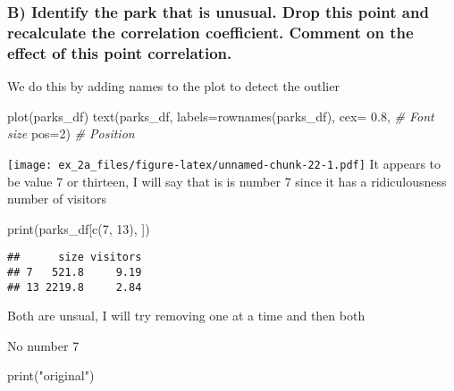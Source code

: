 \documentclass[
]{article}
\newenvironment{Shaded}{\begin{snugshade}}{\end{snugshade}}
\newcommand{\AttributeTok}[1]{\textcolor[rgb]{0.77,0.63,0.00}{#1}}
\newcommand{\CommentTok}[1]{\textcolor[rgb]{0.56,0.35,0.01}{\textit{#1}}}
\newcommand{\DecValTok}[1]{\textcolor[rgb]{0.00,0.00,0.81}{#1}}
\newcommand{\FloatTok}[1]{\textcolor[rgb]{0.00,0.00,0.81}{#1}}
\newcommand{\FunctionTok}[1]{\textcolor[rgb]{0.00,0.00,0.00}{#1}}
\newcommand{\NormalTok}[1]{#1}
\newcommand{\StringTok}[1]{\textcolor[rgb]{0.31,0.60,0.02}{#1}}
\begin{document}
\hypertarget{b-identify-the-park-that-is-unusual.-drop-this-point-and-recalculate-the-correlation-coefficient.-comment-on-the-effect-of-this-point-correlation.}{%
\subsubsection{B) Identify the park that is unusual. Drop this point and
recalculate the correlation coefficient. Comment on the effect of this
point
correlation.}\label{b-identify-the-park-that-is-unusual.-drop-this-point-and-recalculate-the-correlation-coefficient.-comment-on-the-effect-of-this-point-correlation.}}

We do this by adding names to the plot to detect the outlier

\begin{Shaded}
\begin{Highlighting}[]
\FunctionTok{plot}\NormalTok{(parks\_df)}
\FunctionTok{text}\NormalTok{(parks\_df,}
     \AttributeTok{labels=}\FunctionTok{rownames}\NormalTok{(parks\_df),}
     \AttributeTok{cex=} \FloatTok{0.8}\NormalTok{, }\CommentTok{\# Font size}
     \AttributeTok{pos=}\DecValTok{2}\NormalTok{) }\CommentTok{\# Position}
\end{Highlighting}
\end{Shaded}

\texttt{[image: ex\_2a\_files/figure-latex/unnamed-chunk-22-1.pdf]} It
appears to be value 7 or thirteen, I will say that is is number 7 since
it has a ridiculousness number of visitors

\begin{Shaded}
\begin{Highlighting}[]
\FunctionTok{print}\NormalTok{(parks\_df[}\FunctionTok{c}\NormalTok{(}\DecValTok{7}\NormalTok{, }\DecValTok{13}\NormalTok{), ])}
\end{Highlighting}
\end{Shaded}

\begin{verbatim}
##      size visitors
## 7   521.8     9.19
## 13 2219.8     2.84
\end{verbatim}

Both are unsual, I will try removing one at a time and then both

No number 7

\begin{Shaded}
\begin{Highlighting}[]
\FunctionTok{print}\NormalTok{(}\StringTok{"original"}\NormalTok{)}
\end{Highlighting}
\end{Shaded}
\end{document}
